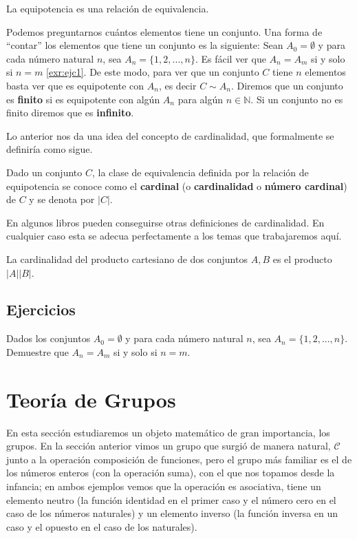 \documentclass[12pt,]{krantz}
\theoremstyle{definition}
\theoremstyle{definition}
\theoremstyle{definition}
\theoremstyle{remark}
\let\BeginKnitrBlock\begin \let\EndKnitrBlock\end
\begin{document}
\BeginKnitrBlock{theorem}
\protect\hypertarget{thm:unnamed-chunk-48}{}{\label{thm:unnamed-chunk-48}
}La equipotencia es una relación de equivalencia.
\EndKnitrBlock{theorem}

Podemos preguntarnos cuántos elementos tiene un conjunto. Una forma de
``contar'' los elementos que tiene un conjunto es la siguiente: Sean
\(A_{0}=\emptyset\) y para cada número natural \(n\), sea
\(A_{n}=\{1,2,..., n\}\). Es fácil ver que \(A_{n}=A_{m}\) si y solo si
\(n=m\) \ref{exr:ejc1}. De este modo, para ver que un conjunto \(C\)
tiene \(n\) elementos basta ver que es equipotente con \(A_{n}\), es
decir \(C\sim A_{n}\). Diremos que un conjunto es \textbf{finito} si es
equipotente con algún \(A_{n}\) para algún \(n\in\mathbb{N}\). Si un
conjunto no es finito diremos que es \textbf{infinito}.

Lo anterior nos da una idea del concepto de cardinalidad, que
formalmente se definiría como sigue.

\BeginKnitrBlock{definition}
\protect\hypertarget{def:unnamed-chunk-49}{}{\label{def:unnamed-chunk-49}
}Dado un conjunto \(C\), la clase de equivalencia definida por la
relación de equipotencia se conoce como el \textbf{cardinal} (o
\textbf{cardinalidad} o \textbf{número cardinal}) de \(C\) y se denota
por \(|C|\).
\EndKnitrBlock{definition}

En algunos libros pueden conseguirse otras definiciones de cardinalidad.
En cualquier caso esta se adecua perfectamente a los temas que
trabajaremos aquí.

\BeginKnitrBlock{remark}
{}La cardinalidad del producto cartesiano de dos
conjuntos \(A, B\) es el producto \(|A||B|\).
\EndKnitrBlock{remark}

\subsection{Ejercicios}\label{ejercicios}

\BeginKnitrBlock{exercise}
\protect\hypertarget{exr:ejc1}{}{\label{exr:ejc1} }Dados los conjuntos
\(A_{0}=\emptyset\) y para cada número natural \(n\), sea
\(A_{n}=\{1,2,..., n\}\). Demuestre que \(A_{n}=A_{m}\) si y solo si
\(n=m\).
\EndKnitrBlock{exercise}

\section{Teoría de Grupos}\label{teoria-de-grupos}

En esta sección estudiaremos un objeto matemático de gran importancia,
los grupos. En la sección anterior vimos un grupo que surgió de manera
natural, \(\mathcal{C}\) junto a la operación composición de funciones,
pero el grupo más familiar es el de los números enteros (con la
operación suma), con el que nos topamos desde la infancia; en ambos
ejemplos vemos que la operación es asociativa, tiene un elemento neutro
(la función identidad en el primer caso y el número cero en el caso de
los números naturales) y un elemento inverso (la función inversa en un
caso y el opuesto en el caso de los naturales).
\end{document}

